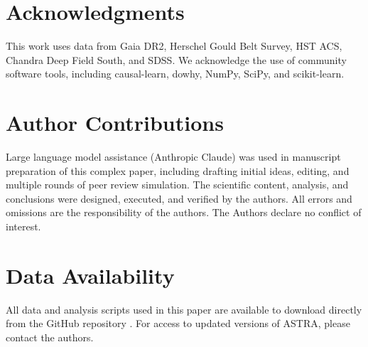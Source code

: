 \documentclass[usenatbib]{rasti}
\begin{document}
\section*{Acknowledgments}

This work uses data from Gaia DR2, Herschel Gould Belt Survey, HST ACS, Chandra Deep Field South, and SDSS. We acknowledge the use of community software tools, including causal-learn, dowhy, NumPy, SciPy, and scikit-learn.

\section*{Author Contributions}

Large language model assistance (Anthropic Claude) was used in manuscript preparation of this complex paper, including drafting initial ideas, editing, and multiple rounds of peer review simulation. The scientific content, analysis, and conclusions were designed, executed, and verified by the authors. All errors and omissions are the responsibility of the authors. The Authors declare no conflict of interest.

\section*{Data Availability}

All data and analysis scripts used in this paper are available to download directly from the GitHub repository \cite{astra_github}. For access to updated versions of ASTRA, please contact the authors.

\label{lastpage}



\end{document}
